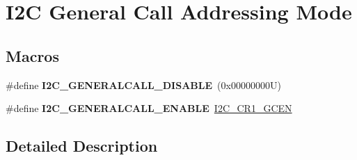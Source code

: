 \hypertarget{group___i2_c___g_e_n_e_r_a_l___c_a_l_l___a_d_d_r_e_s_s_i_n_g___m_o_d_e}{}\section{I2C General Call Addressing Mode}
\label{group___i2_c___g_e_n_e_r_a_l___c_a_l_l___a_d_d_r_e_s_s_i_n_g___m_o_d_e}
\subsection*{Macros}
\begin{DoxyCompactItemize}
\item 
\mbox{\label{group___i2_c___g_e_n_e_r_a_l___c_a_l_l___a_d_d_r_e_s_s_i_n_g___m_o_d_e_ga14918ea7d2b23cd67c66b49ebbf5c0a8}} 
\#define {\bfseries I2\+C\+\_\+\+G\+E\+N\+E\+R\+A\+L\+C\+A\+L\+L\+\_\+\+D\+I\+S\+A\+B\+LE}~(0x00000000\+U)
\item 
\mbox{\label{group___i2_c___g_e_n_e_r_a_l___c_a_l_l___a_d_d_r_e_s_s_i_n_g___m_o_d_e_ga5ec9ec869e4c78a597c5007c245c01a0}} 
\#define {\bfseries I2\+C\+\_\+\+G\+E\+N\+E\+R\+A\+L\+C\+A\+L\+L\+\_\+\+E\+N\+A\+B\+LE}~\hyperlink{group___peripheral___registers___bits___definition_gac28d4f433e501e727c91097dccc4616c}{I2\+C\+\_\+\+C\+R1\+\_\+\+G\+C\+EN}
\end{DoxyCompactItemize}


\subsection{Detailed Description}

